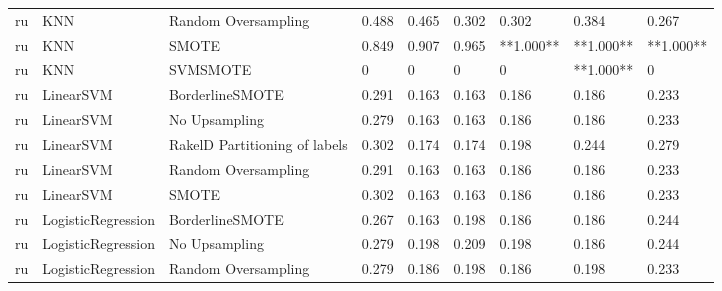 \begin{tabular}{lllllllll}
      ru &                             KNN &           Random Oversampling & 0.488 &                     0.465 &                 0.302 &                  0.302 &                                   0.384 &     0.267 \\
      ru &                             KNN &                         SMOTE & 0.849 &                     0.907 &                 0.965 &              **1.000** &                               **1.000** & **1.000** \\
      ru &                             KNN &                      SVMSMOTE &     0 &                         0 &                     0 &                      0 &                               **1.000** &         0 \\
      ru &                       LinearSVM &               BorderlineSMOTE & 0.291 &                     0.163 &                 0.163 &                  0.186 &                                   0.186 &     0.233 \\
      ru &                       LinearSVM &                 No Upsampling & 0.279 &                     0.163 &                 0.163 &                  0.186 &                                   0.186 &     0.233 \\
      ru &                       LinearSVM & RakelD Partitioning of labels & 0.302 &                     0.174 &                 0.174 &                  0.198 &                                   0.244 &     0.279 \\
      ru &                       LinearSVM &           Random Oversampling & 0.291 &                     0.163 &                 0.163 &                  0.186 &                                   0.186 &     0.233 \\
      ru &                       LinearSVM &                         SMOTE & 0.302 &                     0.163 &                 0.163 &                  0.186 &                                   0.186 &     0.233 \\
      ru &              LogisticRegression &               BorderlineSMOTE & 0.267 &                     0.163 &                 0.198 &                  0.186 &                                   0.186 &     0.244 \\
      ru &              LogisticRegression &                 No Upsampling & 0.279 &                     0.198 &                 0.209 &                  0.198 &                                   0.186 &     0.244 \\
      ru &              LogisticRegression &           Random Oversampling & 0.279 &                     0.186 &                 0.198 &                  0.186 &                                   0.198 &     0.233 \\

\end{tabular}
